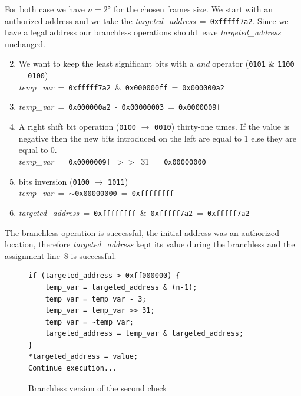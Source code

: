 \documentclass[11pt]{sdm}
\begin{document}
For both case we have $n=2^8$ for the chosen frames size. 
We start with an authorized address and we take the \textit{targeted\_address}~=~\texttt{0xfffff7a2}. Since we have a legal address our branchless operations should leave \textit{targeted\_address} unchanged.
\begin{enumerate}[noitemsep]
	\setcounter{enumi}{1}
	\item We want to keep the least significant bits with a \textit{and} operator (\texttt{0101} \& \texttt{1100} = \texttt{0100})\\
		\textit{temp\_var}~=~\texttt{0xfffff7a2}~\&~\texttt{0x000000ff}~=~\texttt{0x000000a2}
	\item \textit{temp\_var}~=~\texttt{0x000000a2}~-~\texttt{0x00000003}~=~\texttt{0x0000009f}
	\item A right shift bit operation (\texttt{0100} $\rightarrow$ \texttt{0010}) thirty-one times. If the value is negative then the new bits introduced on the left are equal to 1 else they are equal to 0. \\
 \textit{temp\_var}~=~\texttt{0x0000009f}~$>>$~31~=~\texttt{0x00000000}
	\item bits inversion (\texttt{0100} $\rightarrow$ \texttt{1011}) \\
		\textit{temp\_var}~=~$\sim$\texttt{0x00000000}~=~\texttt{0xffffffff}
	\item \textit{targeted\_address}~=~\texttt{0xffffffff}~\&~\texttt{0xfffff7a2}~=~\texttt{0xfffff7a2}
\end{enumerate}
The branchless operation is successful, the initial address was an authorized location, therefore \textit{targeted\_address} kept its value during the branchless and the assignment line~8 is successful.

\begin{figure}[!ht]
\centering
\begin{lstlisting}
if (targeted_address > 0xff000000) {
	temp_var = targeted_address & (n-1);
	temp_var = temp_var - 3;
	temp_var = temp_var >> 31;
	temp_var = ~temp_var;
	targeted_address = temp_var & targeted_address;
}
*targeted_address = value;
Continue execution...
\end{lstlisting}
\caption{Branchless version of the second check}
\label{branchless}
\end{figure}
\end{document}
